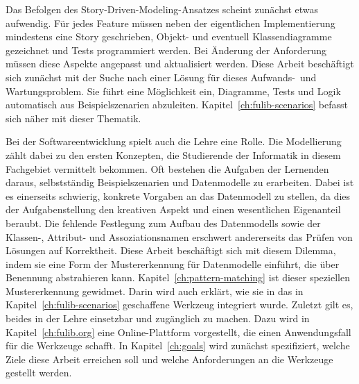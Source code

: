 Das Befolgen des Story-Driven-Modeling-Ansatzes scheint zunächst etwas aufwendig.
Für jedes Feature müssen neben der eigentlichen Implementierung mindestens eine Story geschrieben, Objekt- und eventuell Klassendiagramme gezeichnet und Tests programmiert werden.
Bei Änderung der Anforderung müssen diese Aspekte angepasst und aktualisiert werden.
Diese Arbeit beschäftigt sich zunächst mit der Suche nach einer Lösung für dieses Aufwands-\ und Wartungsproblem.
Sie führt eine Möglichkeit ein, Diagramme, Tests und Logik automatisch aus Beispielszenarien abzuleiten.
Kapitel~\ref{ch:fulib-scenarios} befasst sich näher mit dieser Thematik.

Bei der Softwareentwicklung spielt auch die Lehre eine Rolle.
Die Modellierung zählt dabei zu den ersten Konzepten, die Studierende der Informatik in diesem Fachgebiet vermittelt bekommen.
Oft bestehen die Aufgaben der Lernenden daraus, selbstständig Beispielszenarien und Datenmodelle zu erarbeiten.
Dabei ist es einerseits schwierig, konkrete Vorgaben an das Datenmodell zu stellen, da dies der Aufgabenstellung den kreativen Aspekt und einen wesentlichen Eigenanteil beraubt.
Die fehlende Festlegung zum Aufbau des Datenmodells sowie der Klassen-, Attribut- und Assoziationsnamen erschwert andererseits das Prüfen von Lösungen auf Korrektheit.
Diese Arbeit beschäftigt sich mit diesem Dilemma, indem sie eine Form der Mustererkennung für Datenmodelle einführt, die über Benennung abstrahieren kann.
Kapitel~\ref{ch:pattern-matching} ist dieser speziellen Mustererkennung gewidmet.
Darin wird auch erklärt, wie sie in das in Kapitel~\ref{ch:fulib-scenarios} geschaffene Werkzeug integriert wurde.
Zuletzt gilt es, beides in der Lehre einsetzbar und zugänglich zu machen.
Dazu wird in Kapitel~\ref{ch:fulib.org} eine Online-Plattform vorgestellt, die einen Anwendungsfall für die Werkzeuge schafft.
In Kapitel~\ref{ch:goals} wird zunächst spezifiziert, welche Ziele diese Arbeit erreichen soll und welche Anforderungen an die Werkzeuge gestellt werden.
